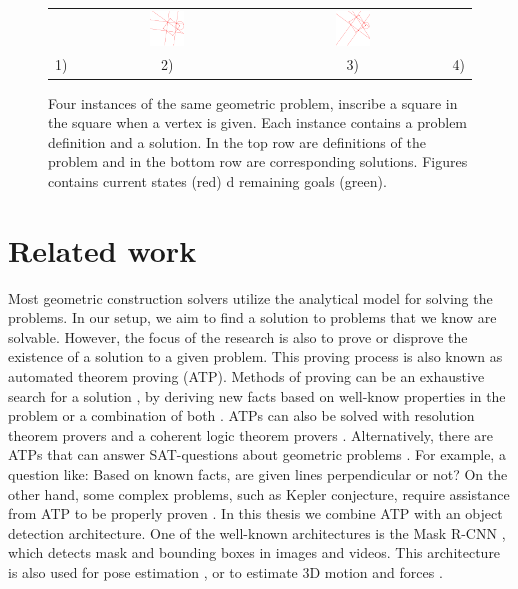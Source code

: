 \begin{figure}[h!]
\begin{tabular}{cccc}
     &
     \includegraphics[width=0.2\textwidth]{img/problem_variability/problem_variability_3_solved.png}
     &
     \includegraphics[width=0.2\textwidth]{img/problem_variability/problem_variability_4_solved.png}
     \\
     1) & 2) & 3) & 4)
     \\
\end{tabular}
\caption{Four instances of the same geometric problem, inscribe a square in the square when a vertex is given. Each instance contains a problem definition and a solution. In the top row are definitions of the problem and in the bottom row are corresponding solutions. Figures contains current states (red) d remaining goals (green).}
\label{variabilty_problem}
\end{figure}

\section{Related work}
Most geometric construction solvers utilize the analytical model for solving the problems. In our setup, we aim to find a solution to problems that we know are solvable. However, the focus of the research is also to prove or disprove the existence of a solution to a given problem. This proving process is also known as automated theorem proving (ATP). Methods of proving can be an exhaustive search for a solution \cite{ancient_problem}, by deriving new facts based on well-know properties in the problem or a combination of both \cite{botana15}. ATPs can also be solved with resolution theorem provers
and a coherent logic theorem provers \cite{stojanovicdurdevic:hal-01091011}. Alternatively, there are ATPs that can answer SAT-questions about geometric problems \cite{seo15}. For example, a question like: Based on known facts, are given lines perpendicular or not? On the other hand, some complex problems, such as Kepler conjecture, require assistance from ATP to be properly proven \cite{DBLP:journals/corr/abs-1211-7012} \cite{hales17}.
\newline 
In this thesis we combine ATP with an object detection architecture. One of the well-known architectures is the Mask {R-CNN} \cite{DBLP:journals/corr/HeGDG17}, which detects mask and bounding boxes in images and videos. This architecture is also used for pose estimation \cite{DBLP:journals/corr/abs-1712-09184}, \cite{Girdhar_2019_CVPR} or to estimate 3D motion and forces \cite{DBLP:journals/corr/abs-1904-02683}.


